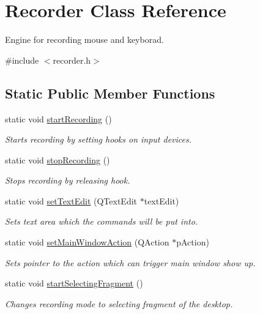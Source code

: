 \hypertarget{class_recorder}{\section{Recorder Class Reference}
\label{class_recorder}
}


Engine for recording mouse and keyborad.  




{\ttfamily \#include $<$recorder.\-h$>$}

\subsection*{Static Public Member Functions}
\begin{DoxyCompactItemize}
\item 
static void \hyperlink{class_recorder_ab0532541b2bfb84cb02ad6d666b41f7f}{start\-Recording} ()
\begin{DoxyCompactList}\small\item\em Starts recording by setting hooks on input devices. \end{DoxyCompactList}\item 
static void \hyperlink{class_recorder_afb273a3cab6cbadc8448de3faaf4cee4}{stop\-Recording} ()
\begin{DoxyCompactList}\small\item\em Stops recording by releasing hook. \end{DoxyCompactList}\item 
static void \hyperlink{class_recorder_a28cae819dd8860adc54c969319802811}{set\-Text\-Edit} (Q\-Text\-Edit $\ast$text\-Edit)
\begin{DoxyCompactList}\small\item\em Sets text area which the commands will be put into. \end{DoxyCompactList}\item 
static void \hyperlink{class_recorder_ac277183858e6cb27564a3d44369c71be}{set\-Main\-Window\-Action} (Q\-Action $\ast$p\-Action)
\begin{DoxyCompactList}\small\item\em Sets pointer to the action which can trigger main window show up. \end{DoxyCompactList}\item 
static void \hyperlink{class_recorder_a571a3c072d1e3faf3bab13935fe46b29}{start\-Selecting\-Fragment} ()
\begin{DoxyCompactList}\small\item\em Changes recording mode to selecting fragment of the desktop. \end{DoxyCompactList}\end{DoxyCompactItemize}
